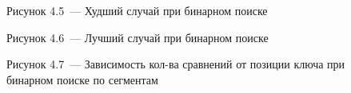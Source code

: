 \documentclass[12pt, a4paper]{report}
\begin{document}
	\begin{figure}[H]
		\caption*{Рисунок 4.5~--- Худший случай при бинарном поиске}
	\end{figure}
	
	\begin{figure}[H]
		\caption*{Рисунок 4.6~--- Лучший случай при бинарном поиске}
	\end{figure}
	
	\begin{figure}[H]
		\caption*{Рисунок 4.7~--- Зависимость кол-ва сравнений от позиции ключа при бинарном поиске по сегментам}
	\end{figure}
	
\end{document}
